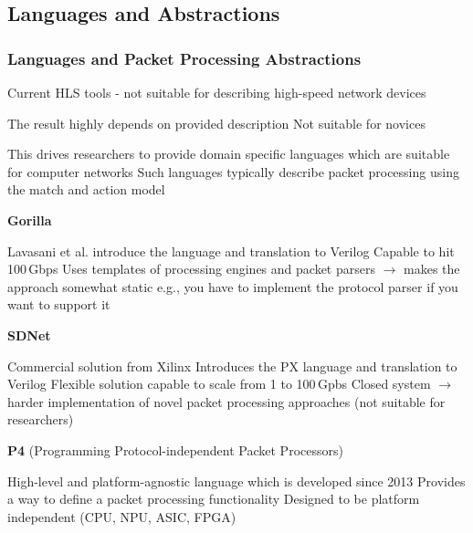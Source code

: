 \subsection*{Languages and Abstractions}
\begin{frame}[allowframebreaks]
    \frametitle{Languages and Packet Processing Abstractions}
    \begin{itemize}
        \fitem Current HLS tools - not suitable for describing high-speed network devices 
        \begin{itemize}
            \fitem The result highly depends on provided description 
            \fitem Not suitable for novices
        \end{itemize}
        \fitem This drives researchers to provide domain specific languages which are suitable for computer networks 
        \fitem Such languages typically describe packet processing using the match and action model
        \begin{enumerate}
            \fitem \textbf{Gorilla}
            \begin{itemize}
                \fitem Lavasani et al. introduce the language and translation to Verilog
                \fitem Capable to hit 100\,Gbps 
                \fitem Uses templates of processing engines and packet parsers $\rightarrow$ makes the approach somewhat static 
                \fitem e.g., you have to implement the protocol parser if you want to support it
            \end{itemize}
            
            \pagebreak
            
            \fitem \textbf{SDNet}
            \begin{itemize}
                \fitem Commercial solution from Xilinx
                \fitem Introduces the PX language and translation to Verilog
                \fitem Flexible solution capable to scale from 1 to 100\,Gpbs
                \fitem Closed system $\rightarrow$ harder implementation of novel packet processing approaches 
                (not suitable for researchers)
            \end{itemize}
            
            \fitem \textbf{P4} (Programming Protocol-independent Packet Processors)
            \begin{itemize}
                \fitem High-level and platform-agnostic language which is developed since 2013
                \fitem Provides a way to define a packet processing functionality
                \fitem Designed to be platform independent (CPU, NPU, ASIC, FPGA)
            \end{itemize}
            
        \end{enumerate}
    \end{itemize}
\end{frame}


